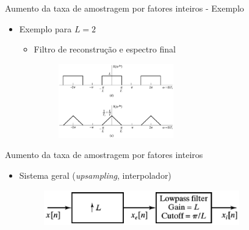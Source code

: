 \documentclass[
size=11pt,
paper=screen,
mode=present,
display=slidesnotes,
style=paintings,
nopagebreaks,
blackslide,
fleqn]{powerdot}
\begin{document}
\begin{slide}{Aumento da taxa de amostragem por fatores inteiros - Exemplo}
	\begin{itemize}
		\item Exemplo para $L=2$
			\begin{itemize}
		\item Filtro de reconstrução e espectro final 
			\begin{figure}
				\centering
				\includegraphics[width=0.5\textwidth]{figs/4-24de.eps}
		        \end{figure}
			\end{itemize}
	\end{itemize}
\end{slide} 
\begin{slide}{Aumento da taxa de amostragem por fatores inteiros}
	\begin{itemize}
		\item Sistema geral (\emph{upsampling}, interpolador) 
			\begin{figure}
				\centering
				\includegraphics[width=0.8\textwidth]{figs/4-23.eps}
		        \end{figure}
	\end{itemize}
\end{slide} 
\end{document}
